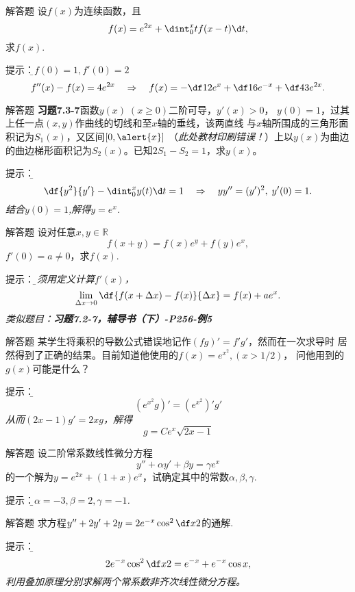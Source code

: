 \begin{frame}{解答题}
	\linespread{1.2}
	设$f(x)$为连续函数，且
	$$f(x)=e^{2x}+\dint_0^xtf(x-t)\d t,$$
	求$f(x)$.
	
	\pause\alert{提示：}\it\b $f(0)=1,f'(0)=2$\pause  
	$$f''(x)-f(x)=4e^{2x}\quad\Rightarrow\quad 
	f(x)=-\df12e^x+\df16e^{-x}+\df43e^{2x}.$$
\end{frame}

\begin{frame}{解答题}
	\linespread{1.2}
	\alert{\bf 习题7.3-7}函数$y(x)\;(x\geq 0)$二阶可导，$y'(x)>0$，
	$y(0)=1$，过其上任一点$(x,y)$作曲线的切线和至$x$轴的垂线，该两直线
	与$x$轴所围成的三角形面积记为$S_1(x)$，又区间$[0,\alert{x}]$
	（\alert{\it 此处教材印刷错误！}）上以$y(x)$为曲边
	的曲边梯形面积记为$S_2(x)$。已知$2S_1-S_2=1$，求$y(x)$。
	
	\pause\alert{提示：}\it\b   
	$$\df{y^2}{y'}-\dint_0^xy(t)\d t=1\quad\Rightarrow\quad 
	yy''=(y')^2,\;y'(0)=1.$$
	\pause 结合$y(0)=1$,解得$y=e^x$.
\end{frame}

\begin{frame}{解答题}
	\linespread{1.2}
	设对任意$x,y\in\mathbb{R}$
	$$f(x+y)=f(x)e^y+f(y)e^x,$$
	$f'(0)=a\ne 0$，求$f(x)$.
	
	\pause\alert{提示：}\it\b 必须用定义计算$f'(x)$，
	$$\lim\limits_{\Delta x\to 0}\df{f(x+\Delta x)-f(x)}{\Delta x}
	=f(x)+ae^x.$$
	\pause 类似题目：\alert{\bf 习题7.2-7，辅导书（下）-P256-例5}
\end{frame}

\begin{frame}{解答题}
	\linespread{1.2}
	某学生将乘积的导数公式错误地记作$(fg)'=f'g'$，然而在一次求导时
	居然得到了正确的结果。目前知道他使用的$f(x)=e^{x^2},(x>1/2)$，
	问他用到的$g(x)$可能是什么？
	
	\pause\alert{提示：}\it\b  
	$$\left(e^{x^2}g\right)'=\left(e^{x^2}\right)'g'$$
	从而$(2x-1)g'=2xg$，解得
	$$g=Ce^x\sqrt{2x-1}$$
\end{frame}

\begin{frame}{解答题}
	\linespread{1.5}
	设二阶常系数线性微分方程
	$$y''+\alpha y'+\beta y=\gamma e^x$$
	的一个解为$y=e^{2x}+(1+x)e^x$，试确定其中的常数$\alpha,\beta,\gamma$.
	
	\pause\alert{提示：}\it\b $\alpha=-3,\beta=2,\gamma=-1$.
\end{frame}

\begin{frame}{解答题}
	\linespread{1.2}
	求方程$y''+2y'+2y=2e^{-x}\cos^2\df x2$的通解.
	
	\pause\alert{提示：}\it\b 
	$$2e^{-x}\cos^2\df x2=e^{-x}+e^{-x}\cos x,$$
	利用叠加原理分别求解两个常系数非齐次线性微分方程。
\end{frame}

